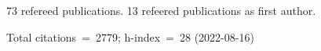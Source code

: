 73 refereed publications. 13 refeered publications as first author.

Total citations~=~2779; h-index~=~28 (2022-08-16)